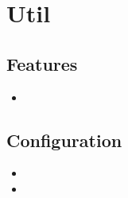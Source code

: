 \section{Util}
\label{module:Util}
\ClearAPI
\TODO
\subsection{Features}
\begin{itemize}
	\item \TODO
\end{itemize}

\subsection{Configuration}
\begin{itemize}
	\item {}
	\item {}
\end{itemize}
